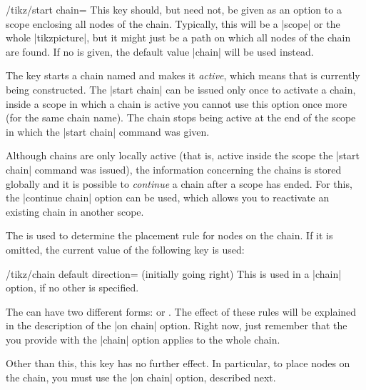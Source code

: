 \begin{key}{/tikz/start chain=}
  This key should, but need not, be given as an option to a scope
  enclosing all nodes of the chain. Typically, this will be a |scope|
  or the whole |tikzpicture|, but it might just be a path on which all
  nodes of the chain are found.
  If no  is given, the default value |chain| will be
  used instead.

  The key starts a chain named  and makes it
  \emph{active}, which means that is currently being constructed. The
  |start chain| can be issued only once to activate a chain, inside a
  scope in which a chain is active you cannot use this option once
  more (for the same chain name). The chain stops being active at the
  end of the scope in which the |start chain| command was given.

  Although chains are only locally active (that is, active inside the
  scope the |start chain| command was issued), the information
  concerning the chains is stored globally and it is possible
  to \emph{continue} a chain after a scope has ended. For this, the
  |continue chain| option can be used, which allows you to reactivate
  an existing chain in another scope.

  The  is used to determine the placement rule for
  nodes on the chain. If it is omitted, the current value of the
  following key is used:
  \begin{key}{/tikz/chain default direction=
      (initially going right)}
    This  is used in a |chain| option, if no other
     is specified.
  \end{key}

  The  can have two different forms:
   or
  . The effect of these rules will be
  explained in the description of the |on chain| option. Right now,
  just remember that the  you provide with the |chain|
  option applies to the whole chain.

  Other than this, this key has no further effect. In particular, to
  place nodes on the chain, you must use the |on chain| option,
  described next.
\begin{codeexample}[]
\end{codeexample}


\end{key}
